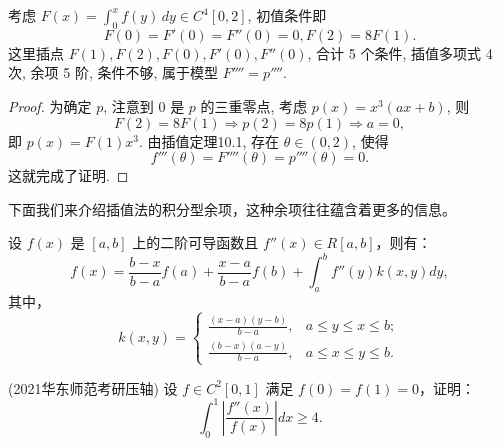 \documentclass[lang=cn,10pt,thmcnt=section]{elegantbook}
\begin{document}
\begin{remark}
	考虑 $F(x) = \int_0^x f(y) \, dy \in C^4[0, 2]$, 初值条件即
\[
F(0) = F'(0) = F''(0) = 0, F(2) = 8F(1).
\]
这里插点 $F(1), F(2), F(0), F'(0), F''(0)$, 合计 5 个条件, 插值多项式 4 次, 余项 5 阶, 条件不够, 属于模型 $F'''' = p''''$.

\end{remark}

\begin{proof}
	为确定 $p$, 注意到 0 是 $p$ 的三重零点, 考虑 $p(x) = x^3(ax+b)$, 则
\[
F(2) = 8F(1) \Rightarrow p(2) = 8p(1) \Rightarrow a=0,
\]
即 $p(x) = F(1)x^3$. 由插值定理10.1, 存在 $\theta \in (0, 2)$, 使得
\[
f'''(\theta) = F''''(\theta) = p''''(\theta) = 0.
\]
这就完成了证明.

\end{proof}
下面我们来介绍插值法的积分型余项，这种余项往往蕴含着更多的信息。
\begin{theorem}[积分型余项]
	设 \( f(x) \) 是 \([a,b]\) 上的二阶可导函数且 \( f''(x) \in R[a,b] \)，则有：
\[ f(x) = \frac{b-x}{b-a}f(a) + \frac{x-a}{b-a}f(b) + \int_a^b f''(y)k(x,y)dy, \]
其中，
\[ k(x,y) = 
\begin{cases} 
\frac{(x-a)(y-b)}{b-a}, & a \leq y \leq x \leq b; \\ 
\frac{(b-x)(a-y)}{b-a}, & a \leq x \leq y \leq b.
\end{cases} \]
\end{theorem}
\begin{example}
	(2021华东师范考研压轴) 设 \( f \in C^2[0,1] \) 满足 \( f(0) = f(1) = 0 \)，证明：
\[ \int_0^1 \left| \frac{f''(x)}{f(x)} \right| dx \geq 4. \]
\end{example}
\end{document}
